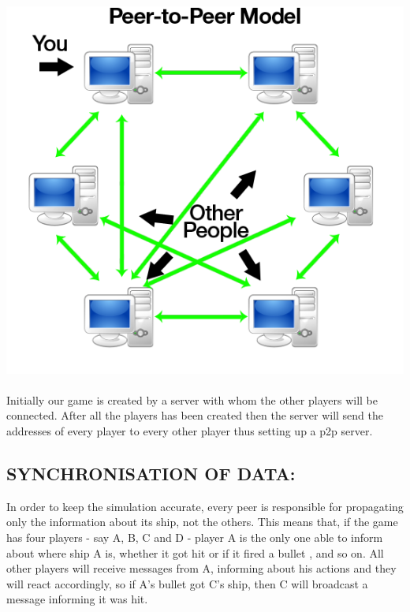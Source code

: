 \documentclass[10pt]{article}
\begin{document}
\includegraphics[width=\textwidth]{pto1.png}
\\
\\
Initially our game is created by a server with whom the other players will be connected. After all the players has been created then the server will send the addresses of every player to every other player thus setting up a p2p server.
\\
\subsection{SYNCHRONISATION OF DATA:}
In order to keep the simulation accurate, every peer is responsible for propagating only the information about its ship, not the others. This means that, if the game has four players - say A, B, C and D - player A is the only one able to inform about where ship A is, whether it got hit or if it fired a bullet , and so on.  All other players will receive messages from A, informing about his actions and they will react accordingly, so if A's bullet got C's ship, then C will broadcast a message informing it was hit.\\
\end{document}
